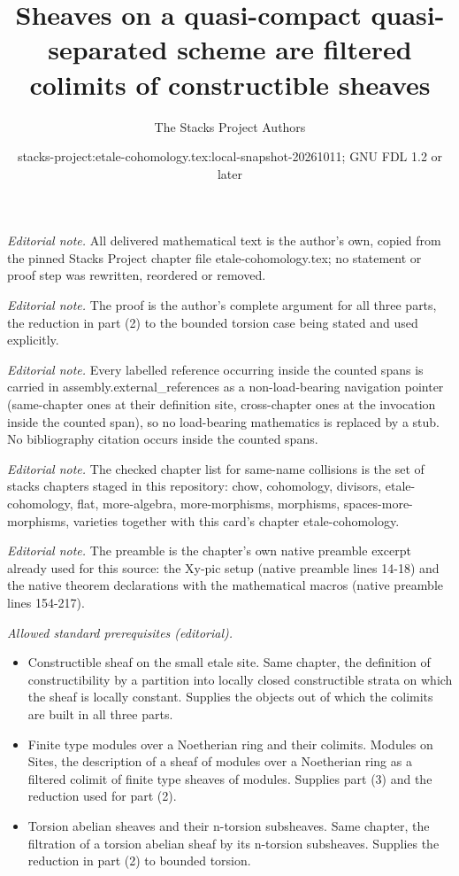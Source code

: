 \documentclass[10pt,a4paper]{amsart}
\title{Sheaves on a quasi-compact quasi-separated scheme are filtered colimits of constructible sheaves}
\author{The Stacks Project Authors}
\date{stacks-project:etale-cohomology.tex:local-snapshot-20261011; GNU FDL 1.2 or later}
\theoremstyle{plain}
\theoremstyle{definition}
\theoremstyle{remark}
\numberwithin{equation}{subsection}
\begin{document}
\maketitle
\noindent\textit{Editorial note.} All delivered mathematical text is the author's own, copied from the pinned Stacks Project chapter file etale-cohomology.tex; no statement or proof step was rewritten, reordered or removed.\par\medskip
\noindent\textit{Editorial note.} The proof is the author's complete argument for all three parts, the reduction in part (2) to the bounded torsion case being stated and used explicitly.\par\medskip
\noindent\textit{Editorial note.} Every labelled reference occurring inside the counted spans is carried in assembly.external\_references as a non-load-bearing navigation pointer (same-chapter ones at their definition site, cross-chapter ones at the invocation inside the counted span), so no load-bearing mathematics is replaced by a stub. No bibliography citation occurs inside the counted spans.\par\medskip
\noindent\textit{Editorial note.} The checked chapter list for same-name collisions is the set of stacks chapters staged in this repository: chow, cohomology, divisors, etale-cohomology, flat, more-algebra, more-morphisms, morphisms, spaces-more-morphisms, varieties together with this card's chapter etale-cohomology.\par\medskip
\noindent\textit{Editorial note.} The preamble is the chapter's own native preamble excerpt already used for this source: the Xy-pic setup (native preamble lines 14-18) and the native theorem declarations with the mathematical macros (native preamble lines 154-217).\par\medskip
\noindent\textit{Allowed standard prerequisites (editorial).}\begin{itemize}
\item Constructible sheaf on the small etale site. Same chapter, the definition of constructibility by a partition into locally closed constructible strata on which the sheaf is locally constant. Supplies the objects out of which the colimits are built in all three parts.
\item Finite type modules over a Noetherian ring and their colimits. Modules on Sites, the description of a sheaf of modules over a Noetherian ring as a filtered colimit of finite type sheaves of modules. Supplies part (3) and the reduction used for part (2).
\item Torsion abelian sheaves and their n-torsion subsheaves. Same chapter, the filtration of a torsion abelian sheaf by its n-torsion subsheaves. Supplies the reduction in part (2) to bounded torsion.
\end{itemize}\medskip
\end{document}
